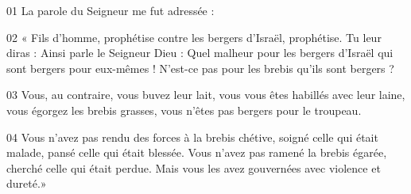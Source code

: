 01 La parole du Seigneur me fut adressée :

02 « Fils d’homme, prophétise contre les bergers d’Israël, prophétise. Tu leur diras : Ainsi parle le Seigneur Dieu : Quel malheur pour les bergers d’Israël qui sont bergers pour eux-mêmes ! N’est-ce pas pour les brebis qu’ils sont bergers ?

03 Vous, au contraire, vous buvez leur lait, vous vous êtes habillés avec leur laine, vous égorgez les brebis grasses, vous n’êtes pas bergers pour le troupeau.

04 Vous n’avez pas rendu des forces à la brebis chétive, soigné celle qui était malade, pansé celle qui était blessée. Vous n’avez pas ramené la brebis égarée, cherché celle qui était perdue. Mais vous les avez gouvernées avec violence et dureté.»
